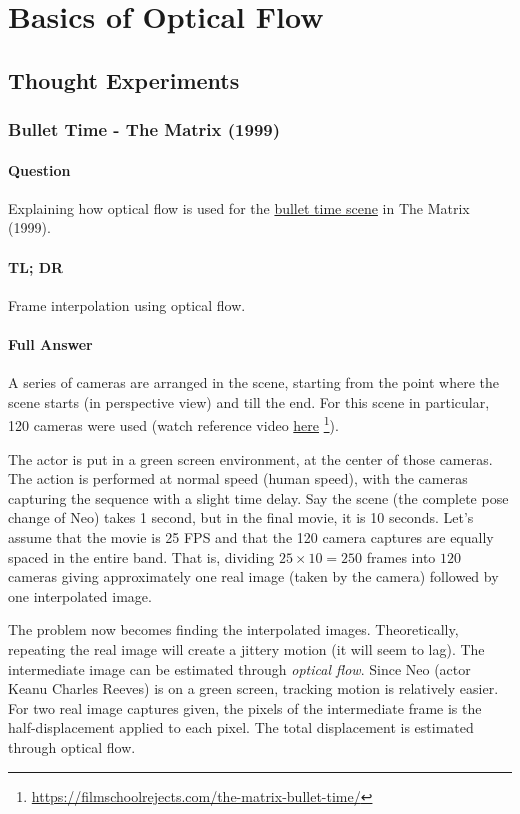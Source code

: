\section{Basics of Optical Flow}

\subsection{Thought Experiments}

\subsubsection{Bullet Time - The Matrix (1999)}

\paragraph*{Question}
Explaining how optical flow is used for the \href{https://www.youtube.com/watch?v=8DajVKAkL50}{bullet time scene} in The Matrix (1999).

\paragraph*{TL; DR}
Frame interpolation using optical flow.

\paragraph*{Full Answer}
A series of cameras are arranged in the scene, starting from the point where the scene starts (in perspective view) and till the end. For this scene in particular, 120 cameras were used (watch reference video \href{https://youtube.com/clip/UgkxKwMsGJCjo-0t9dnsaD6vtVRMl-JRj4wv}{here} \footnote[1]{\url{https://filmschoolrejects.com/the-matrix-bullet-time/}}).

The actor is put in a green screen environment, at the center of those cameras. The action is performed at normal speed (human speed), with the cameras capturing the sequence with a slight time delay. Say the scene (the complete pose change of Neo) takes 1 second, but in the final movie, it is 10 seconds. Let's assume that the movie is 25 FPS and that the 120 camera captures are equally spaced in the entire band. That is, dividing $25\times 10 = 250$ frames into $120$ cameras giving approximately one real image (taken by the camera) followed by one interpolated image.

The problem now becomes finding the interpolated images. Theoretically, repeating the real image will create a jittery motion (it will seem to lag). The intermediate image can be estimated through \emph{optical flow}. Since Neo (actor Keanu Charles Reeves) is on a green screen, tracking motion is relatively easier. For two real image captures given, the pixels of the intermediate frame is the half-displacement applied to each pixel. The total displacement is estimated through optical flow.

